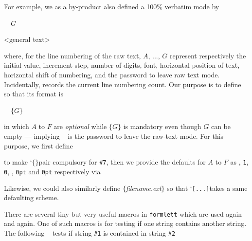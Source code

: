 {\medskip


For example, we as a by-product also defined a 100\%
verbatim mode by

{\stt
\ \ \string\begin@@rawlist[$A$][$B$][$C$][$D$][$E$][$F$]$G$ }\par
\setraw
   <general text>
  \endrawlist
\unsetraw


where, for the line numbering of the raw text, {\tt $A$}, ...,
{\tt $G$} represent respectively the initial value, increment
step, number of digits, font, horizontal position of text,
horizontal shift of numbering, and the password to leave raw text
mode. Incidentally, {\tt \string\linecount} records the current
line numbering count. Our purpose is to define {\tt
\string\beginrawlist} so that its format is

{\stt
\ \ \string\beginrawlist[$A$][$B$][$C$][$D$][$E$][$F$]$\{G\}$}\par

in which $A$ to $F$ are {\sl optional} while $\{G\}$ is mandatory
even though $G$ can be empty --- implying {\tt
\string\endrawlist} is the password to leave the raw-text mode.
For this purpose, we first define

\setraw
\def\begin@rawlist[#1][#2][#3][#4][#5][#6]#{%
    \begin@@rawlist[#1][#2][#3][#4][#5][#6]}%
\unsetraw

to make \lq$\{\}$\rqs pair compulsory for {\tt \#7}, then we
provide the defaults for {\tt $A$} to {$F$} as
{\tt\string\linecount}, {\tt 1}, {\tt 0}, {\tt \string\tiny},
{\tt 0pt} and {\tt 0pt} respectively via

\setraw
\def\beginrawlist{\push{%
 \edef\next@@{\noexpand\begin@rawlist
 [\the\p@r@one][\the\p@r@two][\the\p@r@three]%
 [\the\p@r@four][\the\p@r@five][\the\p@r@six]}%
 \popnil\clrp@r@s\next@@}%
 \font\tiny@rm=cmr5%
 \edef\temp@macro{%
  \noexpand\left@\the\linecount\noexpand\right@
  \noexpand\left@1\noexpand\right@
  \noexpand\left@0\noexpand\right@
  \noexpand\left@\noexpand\tiny@rm
           \noexpand\right@
  \noexpand\left@0pt\noexpand\right@
  \noexpand\left@0pt\noexpand\right@}%
  \expandafter\st@ckparas\temp@macro\p@r@end}%
\unsetraw

\medskip

{\smooth
\relax Likewise, we could also similarly define {\tt \string\printfile
[...]}$\{${\it filename.ext}$\}$ so that \lq{\tt [...]}\rqs takes
a same defaulting scheme. }


\medskip
There are several tiny but very useful macros in {\tt formlett}
which are used again and again. One of such macros is for testing
if one string contains another string. The following {\tt
\string\test@str} tests if string {\tt\#1} is contained in string
{\tt\#2}


}
